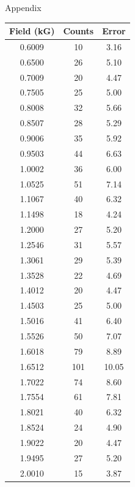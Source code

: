 \newpage \LARGE{Appendix}

\begin{table}[h!]
\begin{minipage}[b]{0.45\linewidth}\centering
\begin{tabular}{|c|c|c|} \hline
Field	(kG)&	Counts	&	Error	\\	\hline
0.6009	&	10	&	3.16	\\	\hline
0.6500	&	26	&	5.10	\\	\hline
0.7009	&	20	&	4.47	\\	\hline
0.7505	&	25	&	5.00	\\	\hline
0.8008	&	32	&	5.66	\\	\hline
0.8507	&	28	&	5.29	\\	\hline
0.9006	&	35	&	5.92	\\	\hline
0.9503	&	44	&	6.63	\\	\hline
1.0002	&	36	&	6.00	\\	\hline
1.0525	&	51	&	7.14	\\	\hline
1.1067	&	40	&	6.32	\\	\hline
1.1498	&	18	&	4.24	\\	\hline
1.2000	&	27	&	5.20	\\	\hline
1.2546	&	31	&	5.57	\\	\hline
1.3061	&	29	&	5.39	\\	\hline
1.3528	&	22	&	4.69	\\	\hline
1.4012	&	20	&	4.47	\\	\hline
1.4503	&	25	&	5.00	\\	\hline
1.5016	&	41	&	6.40	\\	\hline
1.5526	&	50	&	7.07	\\	\hline
1.6018	&	79	&	8.89	\\	\hline
1.6512	&	101	&	10.05	\\	\hline
1.7022	&	74	&	8.60	\\	\hline
1.7554	&	61	&	7.81	\\	\hline
1.8021	&	40	&	6.32	\\	\hline
1.8524	&	24	&	4.90	\\	\hline
1.9022	&	20	&	4.47	\\	\hline
1.9495	&	27	&	5.20	\\	\hline
2.0010	&	15	&	3.87	\\	\hline
\end{tabular}


\end{minipage}
\end{table}
